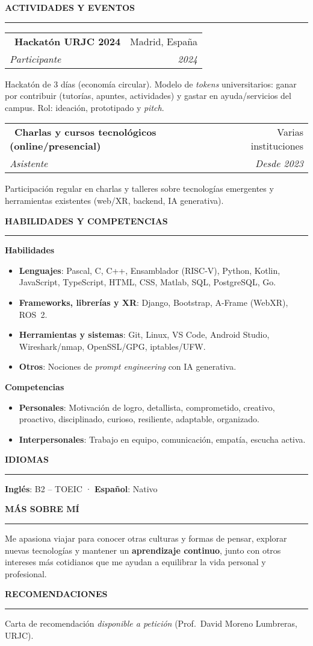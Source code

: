 \documentclass[10pt,a4paper]{article}
\makeatletter
\newcommand{\SectionTitle}[1]{%
	\vspace{5pt}%
	{\bfseries\MakeUppercase{#1}}\par
	\rule{\textwidth}{0.5pt}\vspace{3pt}%
}
\newcommand{\EventEntry}[4]{%
	\begingroup\setlength{\tabcolsep}{0pt}\renewcommand{\arraystretch}{0.95}%
	\noindent\begin{tabular*}{\textwidth}{@{}l@{\extracolsep{\fill}}r@{}}
		\textbullet\ \textbf{#1} & #3 \\
		\textit{#2} & \textit{#4} \\
	\end{tabular*}\par\endgroup
}
\newcommand{\EventDesc}[1]{%
	#1\par\vspace{1pt}%
}
\makeatother
\begin{document}
	\SectionTitle{Actividades y eventos}
	\EventEntry{Hackatón URJC 2024}{Participante}{Madrid, España}{2024}
	\EventDesc{Hackatón de 3 días (economía circular). Modelo de \textit{tokens} universitarios: ganar por contribuir (tutorías, apuntes, actividades) y gastar en ayuda/servicios del campus. Rol: ideación, prototipado y \textit{pitch}.}
	\EventEntry{Charlas y cursos tecnológicos (online/presencial)}{Asistente}{Varias instituciones}{Desde 2023}
	\EventDesc{Participación regular en charlas y talleres sobre tecnologías emergentes y herramientas existentes (web/XR, backend, IA generativa).}
	
	\SectionTitle{HABILIDADES Y COMPETENCIAS}
	\noindent\textbf{Habilidades}
	\vspace{3pt}
	\begin{itemize}
		\item \textbf{Lenguajes}: Pascal, C, C++, Ensamblador (RISC\mbox{-}V), Python, Kotlin, JavaScript, TypeScript, HTML, CSS, Matlab, SQL, PostgreSQL, Go.
		\item \textbf{Frameworks, librerías y XR}: Django, Bootstrap, A-Frame (WebXR), ROS~2.
		\item \textbf{Herramientas y sistemas}: Git, Linux, VS Code, Android Studio, Wireshark/nmap, OpenSSL/GPG, iptables/UFW.
		\item \textbf{Otros}: Nociones de \textit{prompt engineering} con IA generativa.
	\end{itemize}

	\vspace{3pt}
	\noindent\textbf{Competencias}
	\begin{itemize}
		\item \textbf{Personales}: Motivación de logro, detallista, comprometido, creativo, proactivo, disciplinado, curioso, resiliente, adaptable, organizado.
		\item \textbf{Interpersonales}: Trabajo en equipo, comunicación, empatía, escucha activa.
	\end{itemize}
	
	\SectionTitle{Idiomas}\vspace{0pt}
	\noindent \textbf{Inglés}: B2 -- TOEIC \;·\; \textbf{Español}: Nativo
	
	\SectionTitle{Más sobre mí}
	Me apasiona viajar para conocer otras culturas y formas de pensar, explorar nuevas tecnologías y mantener un \textbf{aprendizaje continuo}, junto con otros intereses más cotidianos que me ayudan a equilibrar la vida personal y profesional.
	
	\SectionTitle{Recomendaciones}\vspace{-3pt}
	{\footnotesize\noindent Carta de recomendación \textit{disponible a petición} (Prof.\ David Moreno Lumbreras, URJC).}
	
\end{document}
